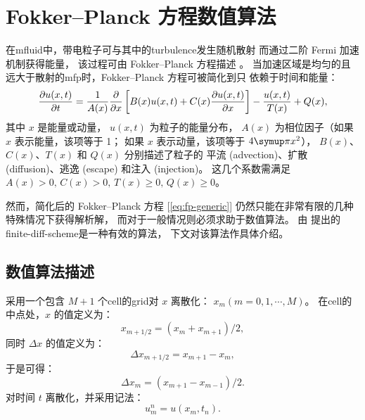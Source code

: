 
\chapter{Fokker--Planck 方程数值算法}
\label{app:fpsolver}

在\ac{mfluid}中，带电粒子可与其中的\ac{turbulence}发生随机散射
而通过二阶 Fermi 加速机制获得能量\cite{fermi1949,fermi1954,davis1956}，
该过程可由 Fokker--Planck 方程描述
\cite{schlickeiser1989,eilek1991,schlickeiser2002}。
当加速区域是均匀的且远大于散射的\ac{mfp}时，Fokker--Planck 方程可被简化到只
依赖于时间和能量\cite{park1995,park1996}：
\begin{equation}
  \label{eq:fp-generic}
  \frac{\partial u(x,t)}{\partial t} = \frac{1}{A(x)} \frac{\partial }{\partial x}
    \left[ B(x) u(x,t) + C(x) \frac{\partial u(x,t)}{\partial x} \right]
    - \frac{u(x,t)}{T(x)} + Q(x) ,
\end{equation}
其中
$x$ 是能量或动量，
$u(x,t)$ 为粒子的能量分布，
$A(x)$ 为相位因子（如果 $x$ 表示能量，该项等于 1；
如果 $x$ 表示动量，该项等于 $4\Cpi x^2$），
$B(x)$、$C(x)$、$T(x)$ 和 $Q(x)$ 分别描述了粒子的
平流 (advection)、扩散 (diffusion)、逃逸 (escape) 和注入 (injection)。
这几个系数需满足 $A(x) > 0,\, C(x) > 0,\, T(x) \ge 0,\, Q(x) \ge 0$。

然而，简化后的 Fokker--Planck 方程 [\autoref{eq:fp-generic}]
仍然只能在非常有限的几种特殊情况下获得解析解，
而对于一般情况则必须求助于数值算法。
由  提出的\ac{finite-diff-scheme}是一种有效的算法，
下文对该算法作具体介绍。


\section{数值算法描述}

采用一个包含 $M+1$ 个\ac{cell}的\ac{grid}对 $x$ 离散化：
$x_m (m = 0, 1, \cdots, M)$。
在\ac{cell}的中点处，$x$ 的值定义为：
\begin{equation}
  \label{eq:x-mid}
  x_{m+1/2} = (x_m + x_{m+1}) \big/ 2 ,
\end{equation}
同时 $\Delta x$ 的值定义为：
\begin{equation}
  \label{eq:dx-mid}
  \Delta x_{m+1/2} = x_{m+1} - x_m ,
\end{equation}
于是可得：
\begin{equation}
  \label{eq:dx}
  \Delta x_m = (x_{m+1} - x_{m-1}) \big/ 2 .
\end{equation}
对时间 $t$ 离散化，并采用记法：
\begin{equation}
  \label{eq:u-t}
  u_m^n = u(x_m, t_n) .
\end{equation}

